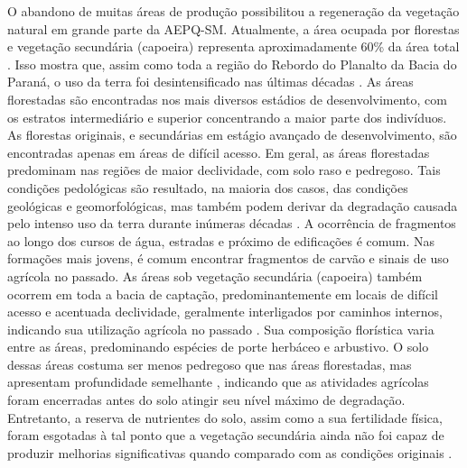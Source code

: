 
O abandono de muitas áreas de produção possibilitou a regeneração da vegetação natural em grande parte da AEPQ-SM. Atualmente, a área ocupada por florestas e vegetação secundária (capoeira) representa aproximadamente 60\% da área total \cite{SamuelRosaEtAl2011a}. Isso mostra que, assim como toda a região do Rebordo do Planalto da Bacia do Paraná, o uso da terra foi desintensificado nas últimas décadas \cite{SEMA/UFSM2001, DillEtAl2004, Poelking2007, Miguel2010, SamuelRosaEtAl2011a, Dullius2012, tenCatenEtAl2012}. As áreas florestadas são encontradas nos mais diversos estádios de desenvolvimento, com os estratos intermediário e superior concentrando a maior parte dos indivíduos. As florestas originais, e secundárias em estágio avançado de desenvolvimento, são encontradas apenas em áreas de difícil acesso. Em geral, as áreas florestadas predominam nas regiões de maior declividade, com solo raso e pedregoso. Tais condições pedológicas são resultado, na maioria dos casos, das condições geológicas e geomorfológicas, mas também podem derivar da degradação causada pelo intenso uso da terra durante inúmeras décadas \cite{SamuelRosaEtAl2011a}. A ocorrência de fragmentos ao longo dos cursos de água, estradas e próximo de edificações é comum. Nas formações mais jovens, é comum encontrar fragmentos de carvão e sinais de uso agrícola no passado. As áreas sob vegetação secundária (capoeira) também ocorrem em toda a bacia de captação, predominantemente em locais de difícil acesso e acentuada declividade, geralmente interligados por caminhos internos, indicando sua utilização agrícola no passado \cite{SamuelRosaEtAl2011a}. Sua composição florística varia entre as áreas, predominando espécies de porte herbáceo e arbustivo. O solo dessas áreas costuma ser menos pedregoso que nas áreas florestadas, mas apresentam profundidade semelhante \cite{SamuelRosaEtAl2011a}, indicando que as atividades agrícolas foram encerradas antes do solo atingir seu nível máximo de degradação. Entretanto, a reserva de nutrientes do solo, assim como a sua fertilidade física, foram esgotadas à tal ponto que a vegetação secundária ainda não foi capaz de produzir melhorias significativas quando comparado com as condições originais \cite{Menezes2008, Zalamena2008}.


